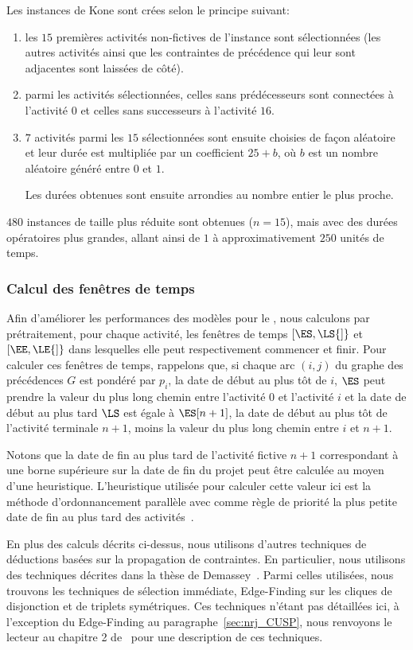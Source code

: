 Les instances de Kone sont crées selon le principe suivant: 
\begin{enumerate}
\item les $15$ premières activités non-fictives de l’instance sont
  sélectionnées (les autres activités ainsi que les contraintes de
  précédence qui leur sont adjacentes sont laissées de côté).
\item parmi les activités sélectionnées, celles sans prédécesseurs
  sont connectées à l’activité 0 et celles sans successeurs à l’activité
  $16$.
\item  $7$ activités parmi les $15$ sélectionnées sont ensuite
  choisies de façon aléatoire et leur durée est multipliée par un
  coefficient $25+b$, où $b$ est un nombre aléatoire généré entre $0$
  et  $1$.

  Les durées obtenues sont ensuite arrondies au nombre entier le plus
  proche. 
\end{enumerate}
$480$ instances de taille plus réduite sont obtenues ($n=15$), mais
avec des durées opératoires plus grandes, allant ainsi de $1$ à
approximativement $250$ unités de temps. 

\subsubsection{Calcul des fenêtres de temps}

Afin d'améliorer les performances des modèles pour le \RCPSP, nous
calculons par prétraitement, pour chaque activité, les fenêtres de
temps $[\ES,\LS{]}$ et $[\EE,\LE{]}$ dans lesquelles elle peut
respectivement commencer et finir. Pour calculer ces fenêtres de
temps, rappelons que, si chaque arc $(i,j)$ du graphe des précédences
$G$ est pondéré par $p_i$, la date de début au plus tôt de $i$, $\ES$
peut prendre la valeur du plus long chemin entre l'activité $0$ et
l'activité $i$ et la date de début au plus tard $\LS$ est égale à
$\ES[n+1]$, la date de début au plus tôt de l'activité terminale
$n+1$, moins la valeur du plus long chemin entre $i$ et $n+1$.

Notons que la date de fin au plus tard de l'activité fictive $n+1$
correspondant à une borne supérieure sur la date de fin du projet peut
être calculée au moyen d'une heuristique. L'heuristique utilisée pour
calculer cette valeur ici est la méthode d'ordonnancement parallèle
avec comme règle de priorité la plus petite date de fin au plus tard
des activités~\cite{heur_RCPSP}. 

En plus des calculs décrits ci-dessus, nous utilisons d'autres
techniques de déductions basées sur la propagation de contraintes. En
particulier, nous utilisons des techniques décrites dans la thèse de
Demassey~\cite{these_Sophie}. Parmi celles utilisées, nous trouvons
les techniques de sélection immédiate, Edge-Finding sur les cliques de
disjonction et de triplets symétriques. Ces techniques n'étant pas
détaillées ici, à l'exception du Edge-Finding au
paragraphe~\ref{sec:nrj_CUSP}, nous renvoyons le lecteur au chapitre 2
de~\cite{these_Sophie} pour une description de ces techniques.
